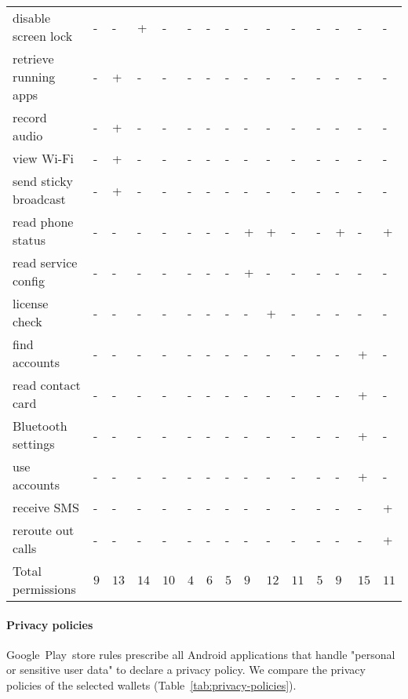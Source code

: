 \begin{table*}
\begin{tabular}{|l|lllllll|lllllll|}
		disable screen lock & - & - & + & - & - & - & - & - & - & - & - & - & - & - \\
		retrieve running apps & - & + & - & - & - & - & - & - & - & - & - & - & - & - \\
		record audio & - & + & - & - & - & - & - & - & - & - & - & - & - & - \\
		view Wi-Fi & - & + & - & - & - & - & - & - & - & - & - & - & - & - \\
		send sticky broadcast & - & + & - & - & - & - & - & - & - & - & - & - & - & - \\
		read phone status & - & - & - & - & - & - & - & + & + & - & - & + & - & + \\
		read service config & - & - & - & - & - & - & - & + & - & - & - & - & - & - \\
		license check & - & - & - & - & - & - & - & - & + & - & - & - & - & - \\
		find accounts & - & - & - & - & - & - & - & - & - & - & - & - & + & - \\
		read contact card & - & - & - & - & - & - & - & - & - & - & - & - & + & - \\
		Bluetooth settings & - & - & - & - & - & - & - & - & - & - & - & - & + & - \\
		use accounts & - & - & - & - & - & - & - & - & - & - & - & - & + & - \\
		receive SMS & - & - & - & - & - & - & - & - & - & - & - & - & - & + \\
		reroute out calls & - & - & - & - & - & - & - & - & - & - & - & - & - & + \\
		\hline
		Total permissions & $9$ & $13$ & $14$ & $10$ & $4$ & $6$ & $5$ & $9$ & $12$ & $11$ & $5$ & $9$ & $15$ & $11$ \\
		\hline
	\end{tabular}
	\label{tab:permissions}
\end{table*}


\paragraph{Privacy policies}
Google~Play~store rules prescribe all Android applications that handle "personal or sensitive user data" to declare a privacy policy.
We compare the privacy policies of the selected wallets (Table~\ref{tab:privacy-policies}).

